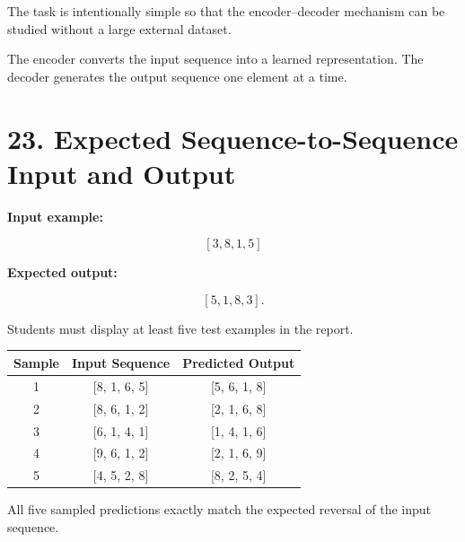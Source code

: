 \documentclass[10pt]{article}
\begin{document}
The task is intentionally simple so that the encoder--decoder mechanism can
be studied without a large external dataset.

\begin{center}
\end{center}

The encoder converts the input sequence into a learned representation.
The decoder generates the output sequence one element at a time.

\section*{23. Expected Sequence-to-Sequence Input and Output}

\textbf{Input example:}

\[
[3,8,1,5]
\]

\textbf{Expected output:}

\[
[5,1,8,3].
\]

Students must display at least five test examples in the report.

\begin{center}
\begin{tabular}{|c|c|c|}
\hline
Sample & Input Sequence & Predicted Output\\
\hline
1 & [8, 1, 6, 5] & [5, 6, 1, 8]\\
2 & [8, 6, 1, 2] & [2, 1, 6, 8]\\
3 & [6, 1, 4, 1] & [1, 4, 1, 6]\\
4 & [9, 6, 1, 2] & [2, 1, 6, 9]\\
5 & [4, 5, 2, 8] & [8, 2, 5, 4]\\
\hline
\end{tabular}
\end{center}

All five sampled predictions exactly match the expected reversal of the
input sequence.
\end{document}
